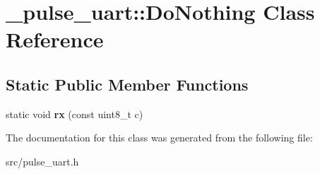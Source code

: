 \hypertarget{class__pulse__uart_1_1DoNothing}{}\section{\+\_\+pulse\+\_\+uart\+:\+:Do\+Nothing Class Reference}
\label{class__pulse__uart_1_1DoNothing}
\subsection*{Static Public Member Functions}
\begin{DoxyCompactItemize}
\item 
static void {\bfseries rx} (const uint8\+\_\+t c)\hypertarget{class__pulse__uart_1_1DoNothing_aa2b42bd8f66520f547959dcbc564b4b0}{}\label{class__pulse__uart_1_1DoNothing_aa2b42bd8f66520f547959dcbc564b4b0}

\end{DoxyCompactItemize}


The documentation for this class was generated from the following file\+:\begin{DoxyCompactItemize}
\item 
src/pulse\+\_\+uart.\+h\end{DoxyCompactItemize}
